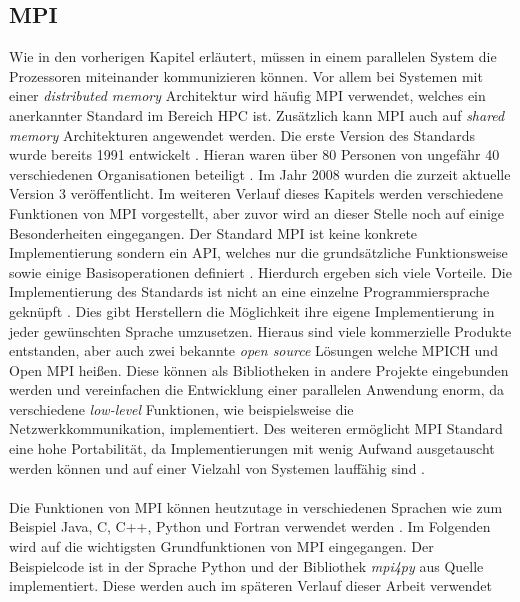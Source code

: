 \subsection{MPI}
Wie in den vorherigen Kapitel erläutert, müssen in einem parallelen System die Prozessoren miteinander kommunizieren können. Vor allem bei Systemen mit einer \emph{distributed memory} Architektur wird häufig \ac{MPI} verwendet, welches ein anerkannter Standard im Bereich \ac{HPC} ist. Zusätzlich kann \ac{MPI} auch auf \emph{shared memory} Architekturen angewendet werden. Die erste Version des Standards wurde bereits 1991 entwickelt \cite{nielsen2016introduction}. Hieran waren über 80 Personen von ungefähr 40 verschiedenen Organisationen beteiligt \cite{dongarra1995introduction}. Im Jahr 2008 wurden die zurzeit aktuelle Version 3 veröffentlicht. Im weiteren Verlauf dieses Kapitels werden verschiedene Funktionen von \ac{MPI} vorgestellt, aber zuvor wird an dieser Stelle noch auf einige Besonderheiten eingegangen. Der Standard \ac{MPI} ist keine konkrete Implementierung sondern ein \ac{API}, welches nur die grundsätzliche Funktionsweise sowie einige Basisoperationen definiert \cite{nielsen2016introduction}. Hierdurch ergeben sich viele Vorteile. Die Implementierung des Standards ist nicht an eine einzelne Programmiersprache geknüpft \cite{nielsen2016introduction}. Dies gibt Herstellern die Möglichkeit ihre eigene Implementierung in jeder gewünschten Sprache umzusetzen. Hieraus sind viele kommerzielle Produkte entstanden, aber auch zwei bekannte \emph{open source} Lösungen welche MPICH und Open MPI heißen. Diese können als Bibliotheken in andere Projekte eingebunden werden und vereinfachen die Entwicklung einer parallelen Anwendung enorm, da verschiedene \emph{low-level} Funktionen, wie beispielsweise die Netzwerkkommunikation, implementiert. Des weiteren ermöglicht \ac{MPI} Standard eine hohe Portabilität, da Implementierungen mit wenig Aufwand ausgetauscht werden können und auf einer Vielzahl von Systemen lauffähig sind \cite{dalcin2008mpi}.
\\\\
Die Funktionen von \ac{MPI} können heutzutage in verschiedenen Sprachen wie zum Beispiel Java, C, C++, Python und Fortran verwendet werden \cite{nielsen2016introduction}. Im Folgenden wird auf die wichtigsten Grundfunktionen von \ac{MPI} eingegangen. Der Beispielcode ist in der Sprache Python und der Bibliothek \emph{mpi4py} aus Quelle \cite{dalcin2008mpi} implementiert. Diese werden auch im späteren Verlauf dieser Arbeit verwendet
